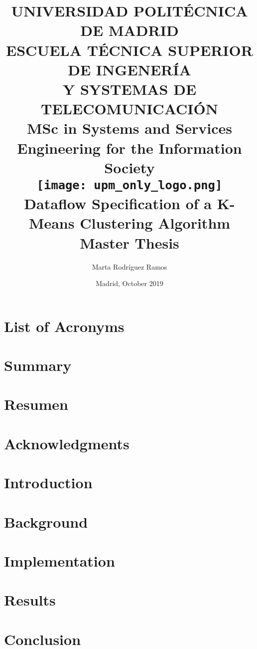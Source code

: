 \documentclass[11pt, a4paper, oneside]{report}
\title{{\LARGE UNIVERSIDAD POLITÉCNICA\\ DE MADRID}\\
\vskip 5mm
{\large \textbf{ESCUELA TÉCNICA SUPERIOR DE INGENERÍA\\
Y SYSTEMAS DE TELECOMUNICACIÓN}}\\
\vskip 5mm
{\large MSc in Systems and Services Engineering for the Information Society}\\
\vskip 10mm
{\texttt{[image: upm\_only\_logo.png]}}\\
\vskip 5mm
{\textbf{Dataflow Specification of a K-Means Clustering Algorithm}}\\
\vskip 10mm
{Master Thesis}}
\author{Marta Rodríguez Ramos}
\date{Madrid, October 2019}
\begin{document}

\sloppy
\maketitle\thispagestyle{empty}
\tableofcontents
\listoffigures
\listoftables
\chapter*{List of Acronyms}
	
\onehalfspacing
{}
\justify
\chapter*{Summary}
	
\chapter*{Resumen}
	
\chapter*{Acknowledgments}
	
\chapter{Introduction}
	
\chapter{Background}
	\label{sec:background}
	
\chapter{Implementation}
	\label{sec:implementation}
	
\chapter{Results}
	\label{sec:results}
	
\chapter{Conclusion}
	\label{sec:conclusion}
	

\printbibliography
%
%
\end{document}
